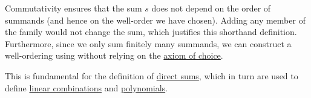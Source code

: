 \begin{remark}
\begin{thmenum}
\begin{thmenum}
      Commutativity ensures that the sum \( s \) does not depend on the order of summands (and hence on the well-order we have chosen). Adding any member of the family would not change the sum, which justifies this shorthand definition. Furthermore, since we only sum finitely many summands, we can construct a well-ordering using  without relying on the \hyperref[def:zfc/choice]{axiom of choice}.

      This is fundamental for the definition of \hyperref[def:semimodule_direct_sum]{direct sums}, which in turn are used to define \hyperref[def:linear_combination]{linear combinations} and \hyperref[def:polynomial_algebra]{polynomials}.
    \end{thmenum}
  \end{thmenum}
\end{remark}

